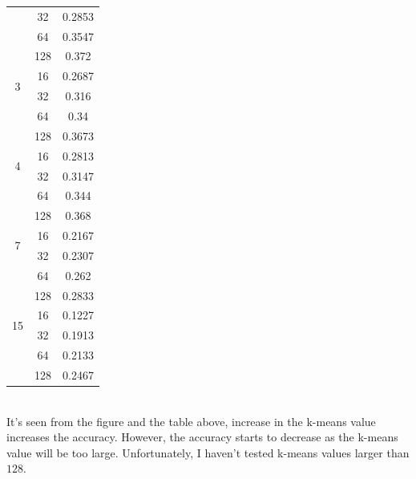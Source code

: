 \documentclass[12pt]{article}
\begin{document}
\begin{itemize}
\begin{minipage}{\textwidth}
\begin{minipage}{0.49\textwidth}
\begin{tabular}{ | c | c | c | }
				   	\cline{2-3}
				   	& 32 & 0.2853 \\
				   	\cline{2-3}
				   	& 64 & 0.3547 \\
				   	\cline{2-3}
				   	& 128 & 0.372 \\
				  	\hline
				   	\multirow{2}{*}{3} & 16 & 0.2687 \\
				   	\cline{2-3}
				   	& 32 & 0.316 \\
				   	\cline{2-3}
				   	& 64 & 0.34 \\
				   	\cline{2-3}
				   	& 128 & 0.3673 \\
				  	\hline
				   	\multirow{2}{*}{4} & 16 & 0.2813 \\
				   	\cline{2-3}
				   	& 32 & 0.3147 \\
				   	\cline{2-3}
				   	& 64 & 0.344 \\
				   	\cline{2-3}
				   	& 128 & 0.368 \\
				  	\hline
				   	\multirow{2}{*}{7} & 16 & 0.2167 \\
				   	\cline{2-3}
				   	& 32 & 0.2307 \\
				   	\cline{2-3}
				   	& 64 & 0.262 \\
				   	\cline{2-3}
				   	& 128 & 0.2833 \\
				  	\hline
				   	\multirow{2}{*}{15} & 16 & 0.1227 \\
				   	\cline{2-3}
				   	& 32 & 0.1913 \\
				   	\cline{2-3}
				   	& 64 & 0.2133 \\
				   	\cline{2-3}
				   	& 128 & 0.2467 \\
				  	\hline
				\end{tabular}
				\captionsetup{width=.8\textwidth}
			\end{minipage}
		\end{minipage} \\
		
		It's seen from the figure and the table above, increase in the k-means value increases the accuracy. However, the accuracy starts to decrease as the k-means value will be too large. Unfortunately, I haven't tested k-means values larger than $128$.
    \end{itemize}
\end{document}
